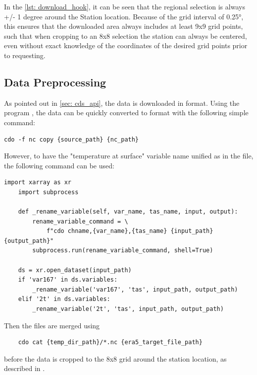 In the \autoref{lst: download_hook}, it can be seen that the regional selection is always +/- 1 degree around the Station location.
Because of the grid interval of 0.25°, this ensures that the downloaded area always includes at least 9x9 grid points, such that when cropping to an 8x8 selection the station can always be centered, even without exact knowledge of the coordinates of the desired grid points prior to requesting. 


\subsection{Data Preprocessing}

As pointed out in \autoref{sec: cds_api}, the data is downloaded in  format.
Using the program , the data can be quickly converted to  format with the following simple command:

\begin{lstlisting}
cdo -f nc copy {source_path} {nc_path}
\end{lstlisting}

However, to have the "temperature at surface" variable name unified as  in the  file, the following command can be used:

\begin{lstlisting}[caption=Renaming Variable in \code{NetCDF} File, label=lst: rename_variable]
    import xarray as xr
    import subprocess

    def _rename_variable(self, var_name, tas_name, input, output):
        rename_variable_command = \
            f"cdo chname,{var_name},{tas_name} {input_path} {output_path}"
        subprocess.run(rename_variable_command, shell=True)
        
    ds = xr.open_dataset(input_path)
    if 'var167' in ds.variables:
        _rename_variable('var167', 'tas', input_path, output_path)
    elif '2t' in ds.variables:
        _rename_variable('2t', 'tas', input_path, output_path)

\end{lstlisting}

Then the files are merged using 

\begin{lstlisting}
    cdo cat {temp_dir_path}/*.nc {era5_target_file_path}
\end{lstlisting}

before the data is cropped to the 8x8 grid around the station location, as described in .

